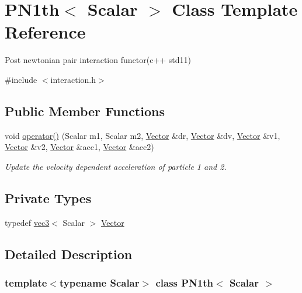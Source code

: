 \hypertarget{class_p_n1th}{}\section{P\+N1th$<$ Scalar $>$ Class Template Reference}
\label{class_p_n1th}


Post newtonian pair interaction functor(c++ std11)  




{\ttfamily \#include $<$interaction.\+h$>$}

\subsection*{Public Member Functions}
\begin{DoxyCompactItemize}
\item 
void \mbox{\hyperlink{class_p_n1th_a1ed48e417256ef44bf6faa3e7c433b7e}{operator()}} (Scalar m1, Scalar m2, \mbox{\hyperlink{class_p_n1th_affb0517b66197be4e03c50d632f35c3f}{Vector}} \&dr, \mbox{\hyperlink{class_p_n1th_affb0517b66197be4e03c50d632f35c3f}{Vector}} \&dv, \mbox{\hyperlink{class_p_n1th_affb0517b66197be4e03c50d632f35c3f}{Vector}} \&v1, \mbox{\hyperlink{class_p_n1th_affb0517b66197be4e03c50d632f35c3f}{Vector}} \&v2, \mbox{\hyperlink{class_p_n1th_affb0517b66197be4e03c50d632f35c3f}{Vector}} \&acc1, \mbox{\hyperlink{class_p_n1th_affb0517b66197be4e03c50d632f35c3f}{Vector}} \&acc2)
\begin{DoxyCompactList}\small\item\em Update the velocity dependent acceleration of particle 1 and 2. \end{DoxyCompactList}\end{DoxyCompactItemize}
\subsection*{Private Types}
\begin{DoxyCompactItemize}
\item 
typedef \mbox{\hyperlink{structvec3}{vec3}}$<$ Scalar $>$ \mbox{\hyperlink{class_p_n1th_affb0517b66197be4e03c50d632f35c3f}{Vector}}
\end{DoxyCompactItemize}


\subsection{Detailed Description}
\subsubsection*{template$<$typename Scalar$>$\newline
class P\+N1th$<$ Scalar $>$}

